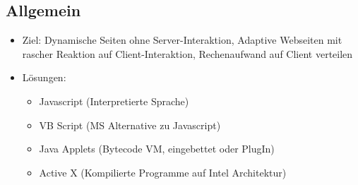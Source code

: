 \documentclass{article} %
\begin{document}
	\subsection{Allgemein}
	\begin{itemize}
		\item Ziel: Dynamische Seiten ohne Server-Interaktion, Adaptive Webseiten mit rascher Reaktion auf Client-Interaktion, Rechenaufwand auf Client verteilen
		\item Lösungen: 
		\begin{itemize}
			\item Javascript (Interpretierte Sprache)
			\item VB Script (MS Alternative zu Javascript)
			\item Java Applets (Bytecode VM, eingebettet oder PlugIn)
			\item Active X (Kompilierte Programme auf Intel Architektur)
		\end{itemize}
		

\end{itemize}
\end{document}
